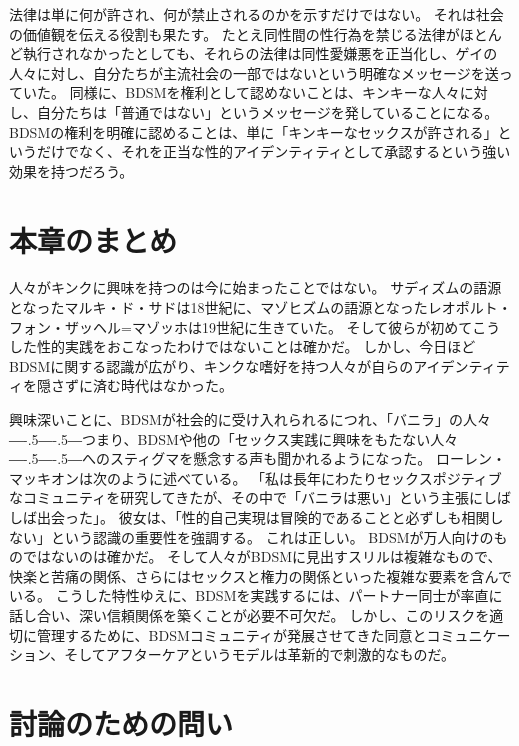 \documentclass[paper=a4,book,openany]{jlreq}
\newcommand{\ig}[1]{}           %
\def\DDASH{―\kern-.5\zw―\kern-.5\zw―}
\begin{document}
法律は単に何が許され、何が禁止されるのかを示すだけではない。
それは社会の価値観を伝える役割も果たす。
たとえ同性間の性行為を禁じる法律がほとんど執行されなかったとしても、それらの法律は同性愛嫌悪を正当化し、ゲイの人々に対し、自分たちが主流社会の一部ではないという明確なメッセージを送っていた。
同様に、BDSMを権利として認めないことは、キンキーな人々に対し、自分たちは「普通ではない」というメッセージを発していることになる。
BDSMの権利を明確に認めることは、単に「キンキーなセックスが許される」というだけでなく、それを正当な性的アイデンティティとして承認するという強い効果を持つだろう。

\section{本章のまとめ}

人々がキンクに興味を持つのは今に始まったことではない。
サディズムの語源となったマルキ・ド・サドは18世紀に、マゾヒズムの語源となったレオポルト・フォン・ザッヘル=マゾッホは19世紀に生きていた。
そして彼らが初めてこうした性的実践をおこなったわけではないことは確かだ。
しかし、今日ほどBDSMに関する認識が広がり、キンクな嗜好を持つ人々が自らのアイデンティティを隠さずに済む時代はなかった。

興味深いことに、BDSMが社会的に受け入れられるにつれ、「バニラ」の人々{\DDASH}つまり、BDSMや他の「セックス実践に興味をもたない人々{\DDASH}へのスティグマを懸念する声も聞かれるようになった。
ローレン・マッキオン\ig{(Lauren McKeon)}は次のように述べている。
「私は長年にわたりセックスポジティブなコミュニティを研究してきたが、その中で「バニラは悪い」という主張にしばしば出会った」。
彼女は、「性的自己実現は冒険的であることと必ずしも相関しない」という認識の重要性を強調する\citep{mckeon17:_when_it_comes}。
これは正しい。
BDSMが万人向けのものではないのは確かだ。
そして人々がBDSMに見出すスリルは複雑なもので、快楽と苦痛の関係、さらにはセックスと権力の関係といった複雑な要素を含んでいる。
こうした特性ゆえに、BDSMを実践するには、パートナー同士が率直に話し合い、深い信頼関係を築くことが必要不可欠だ。
しかし、このリスクを適切に管理するために、BDSMコミュニティが発展させてきた同意とコミュニケーション、そしてアフターケアというモデルは革新的で刺激的なものだ。

\section{討論のための問い}
\end{document}
